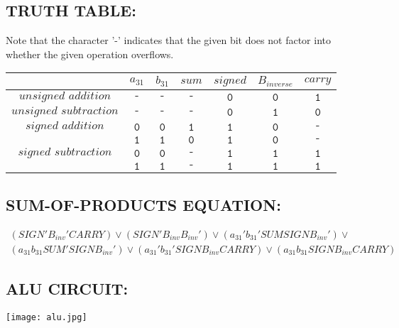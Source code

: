 \documentclass[a4paper]{article}
\begin{document}
\subsection*{TRUTH TABLE:}
Note that the character '-' indicates that the given bit does not factor into whether the given operation overflows.
\begin{center}
\begin{tabular}{|c|c|c|c|c|c|c|}
\hline
& $\textit{a}_{31}$ & $\textit{b}_{31}$ & $\textit{sum}$ & $\textit{signed}$ & $\textit{B}_{inverse}$ & $\textit{carry}$ \\
\hline
\hline
$\textit{unsigned addition}$ & $\texttt{-}$ & $\texttt{-}$ & $\texttt{-}$ & $\texttt{0}$ & $\texttt{0}$ & $\texttt{1}$ \\
\hline
\hline
$\textit{unsigned subtraction}$ & $\texttt{-}$ & $\texttt{-}$ & $\texttt{-}$ & $\texttt{0}$ & $\texttt{1}$ & $\texttt{0}$ \\
\hline
\hline
$\textit{signed addition}$ & $\texttt{0}$ & $\texttt{0}$ & $\texttt{1}$ & $\texttt{1}$ & $\texttt{0}$ & $\texttt{-}$ \\
\hline
 & $\texttt{1}$ & $\texttt{1}$ & $\texttt{0}$ & $\texttt{1}$ & $\texttt{0}$ & $\texttt{-}$ \\
\hline
\hline
$\textit{signed subtraction}$ & $\texttt{0}$ & $\texttt{0}$ & $\texttt{-}$ & $\texttt{1}$ & $\texttt{1}$ & $\texttt{1}$ \\
\hline
 & $\texttt{1}$ & $\texttt{1}$ & $\texttt{-}$ & $\texttt{1}$ & $\texttt{1}$ & $\texttt{1}$ \\
\hline
\end{tabular}
\end{center}

\subsection*{SUM-OF-PRODUCTS EQUATION:}

\begin{eqnarray*} 
(SIGN' B_{inv}' CARRY) \vee (SIGN' B_{inv} B_{inv}') \vee (a_{31}' b_{31}' SUM SIGN B_{inv}') \vee \\
(a_{31} b_{31} SUM' SIGN B_{inv}') \vee (a_{31}' b_{31}' SIGN B_{inv} CARRY) \vee (a_{31} b_{31} SIGN B_{inv} CARRY)
\end{eqnarray*}

\subsection*{ALU CIRCUIT:}

\texttt{[image: alu.jpg]}
\end{document}
